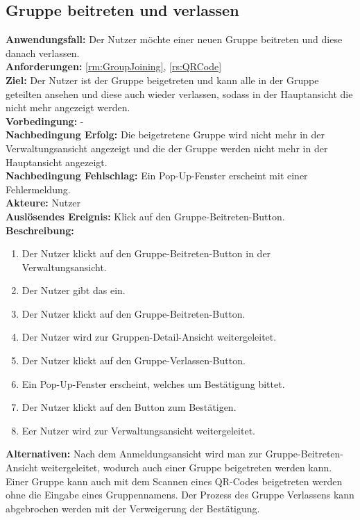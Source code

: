 \documentclass[parskip=full]{scrartcl}
\begin{document}
\subsection{Gruppe beitreten und verlassen}
\textbf{Anwendungsfall:} Der Nutzer möchte einer neuen Gruppe beitreten und diese danach verlassen.\\
\textbf{Anforderungen:} \ref{rm:GroupJoining}, \ref{rs:QRCode} \\
\textbf{Ziel:} Der Nutzer ist der Gruppe beigetreten und kann alle in der Gruppe geteilten  ansehen und diese auch wieder verlassen, sodass in der Hauptansicht die  nicht mehr angezeigt werden.\\
\textbf{Vorbedingung:} -\\
\textbf{Nachbedingung Erfolg:} Die beigetretene Gruppe wird nicht mehr in der Verwaltungsansicht angezeigt und die  der Gruppe werden nicht mehr in der Hauptansicht angezeigt.\\
\textbf{Nachbedingung Fehlschlag:} Ein Pop-Up-Fenster erscheint mit einer Fehlermeldung.\\
\textbf{Akteure:} Nutzer\\
\textbf{Auslösendes Ereignis:} Klick auf den Gruppe-Beitreten-Button.\\
\textbf{Beschreibung:}\\
\begin{enumerate}
    \item Der Nutzer klickt auf den Gruppe-Beitreten-Button in der Verwaltungsansicht.
    \item Der Nutzer gibt das  ein.
    \item Der Nutzer klickt auf den Gruppe-Beitreten-Button.
    \item Der Nutzer wird zur Gruppen-Detail-Ansicht weitergeleitet.
    \item Der Nutzer klickt auf den Gruppe-Verlassen-Button.
    \item Ein Pop-Up-Fenster erscheint, welches um Bestätigung bittet.
    \item Der Nutzer klickt auf den Button zum Bestätigen.
    \item Eer Nutzer wird zur Verwaltungsansicht weitergeleitet.
\end{enumerate}
\textbf{Alternativen:} Nach dem Anmeldungsansicht wird man zur Gruppe-Beitreten-Ansicht weitergeleitet, wodurch auch einer Gruppe beigetreten werden kann. Einer Gruppe kann auch mit dem Scannen eines QR-Codes beigetreten werden ohne die Eingabe eines Gruppennamens. Der Prozess des Gruppe Verlassens kann abgebrochen werden mit der Verweigerung der Bestätigung.
\newpage
\end{document}
